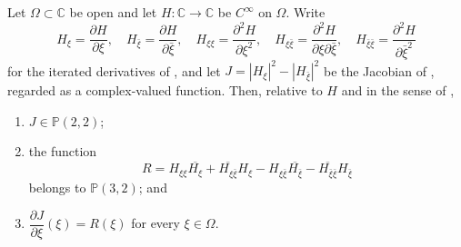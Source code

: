 \begin{lemma}
Let $\Omega\subset\mathbb{C}$ be open and let $H\colon\mathbb{C}\to\mathbb{C}$
be $C^\infty$ on $\Omega$.  Write
\[
  H_\xi=\frac{\partial H}{\partial\xi},\quad
  H_{\bar\xi}=\frac{\partial H}{\partial\bar\xi},\quad
  H_{\xi\xi}=\frac{\partial^2H}{\partial\xi^2},\quad
  H_{\xi\bar\xi}=\frac{\partial^2H}{\partial\xi\partial\bar\xi},\quad
  H_{\bar\xi\bar\xi}=\frac{\partial^2H}{\partial\bar\xi^2}
\]
for the iterated derivatives of , and let
$J=|H_\xi|^2-|H_{\bar\xi}|^2$ be the Jacobian of , regarded as a
complex-valued function.  Then, relative to $H$ and in the sense of
,
\begin{enumerate}
\item[(a)] $J\in\mathbb{P}(2,2)$;
\item[(b)] the function
\[
  R=H_{\xi\xi}\overline{H_\xi}+\overline{H_{\xi\bar\xi}}H_\xi
     -H_{\xi\bar\xi}\overline{H_{\bar\xi}}-\overline{H_{\bar\xi\bar\xi}}H_{\bar\xi}
\]
belongs to $\mathbb{P}(3,2)$; and
\item[(c)] $\dfrac{\partial J}{\partial\xi}(\xi)=R(\xi)$ for every
$\xi\in\Omega$.
\end{enumerate}
\end{lemma}
